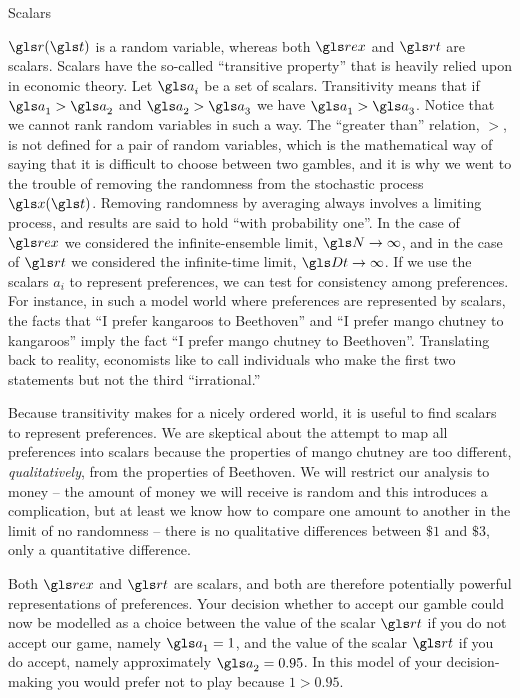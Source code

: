 \begin{excursion}{Scalars}

$\gr(\t)$ is a random variable, whereas both $\rex$ and $\rt$ are scalars.
Scalars have the so-called ``transitive property'' that is heavily relied upon in 
economic theory. Let $\ga_i$ be a set of scalars. Transitivity means that if $\ga_1>\ga_2$ and 
$\ga_2>\ga_3$ we have $\ga_1>\ga_3$. Notice that we cannot rank random variables 
in such a way. The ``greater than'' relation, $>$,
is not defined for a pair of random variables, which is the mathematical
way of saying that it is difficult to choose between two gambles, and it is why 
we went to the trouble of removing the randomness from the stochastic process 
$\x(\t)$. Removing randomness by
averaging always involves a limiting process, and results are said to hold ``with probability one''. 
In the case of $\rex$ we considered the infinite-ensemble limit, $\N\to \infty$, and 
in the case of $\rt$ we considered the infinite-time limit, $\Dt\to\infty$. If we use the scalars 
$a_i$ to represent preferences, we can test for consistency among preferences. 
For instance, in such a model world where preferences are represented by scalars, 
the facts that ``I prefer kangaroos to Beethoven'' and ``I prefer mango chutney to kangaroos'' 
imply the fact ``I prefer mango chutney to Beethoven''. Translating back to reality, 
economists like to call individuals who make the first two statements but not the 
third ``irrational.'' 

Because transitivity makes for a
nicely ordered world, it is useful to find scalars to represent preferences.
We are skeptical about the attempt to map all preferences
into scalars because  the properties of mango chutney are too different, {\it qualitatively},
from the properties of Beethoven. We will restrict our analysis to money --
the amount of money we will receive is random and this introduces
a complication, but at least we know how to compare one amount to 
another in the limit of no randomness -- there is no qualitative differences 
between $\$1$ and $\$3$, only a quantitative difference. 

Both $\rex$ and $\rt$ are scalars, and both are therefore potentially powerful 
representations of preferences. Your decision whether to accept our gamble could
now be modelled as a choice between the value of the scalar $\rt$ if you do not
accept our game, namely $\ga_1=1$, and the value of the scalar $\rt$ if you do accept, 
namely approximately $\ga_2=0.95$. In this model of your decision-making you 
would prefer not to play because $1>0.95$.

\end{excursion}

